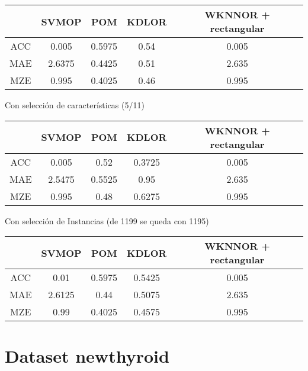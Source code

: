\begin{tabular}{ c c c c c }
	& SVMOP & POM & KDLOR & WKNNOR + rectangular \\
	\hline	
	ACC &	0.005 & 0.5975 & 0.54  & 0.005 \\
	MAE &	2.6375 & 0.4425 & 0.51  & 2.635 \\
	MZE &	0.995 & 0.4025 & 0.46  & 0.995  \\
	\hline  
\end{tabular}

Con selección de características (5/11)

\begin{tabular}{ c c c c c }
	& SVMOP & POM & KDLOR & WKNNOR + rectangular \\
	\hline	
	ACC &	0.005 & 0.52 & 0.3725  & 0.005 \\
	MAE &	2.5475 & 0.5525 & 0.95  & 2.635 \\
	MZE &	0.995 & 0.48 & 0.6275 & 0.995  \\
	\hline  
\end{tabular}

Con selección de Instancias (de 1199 se queda con 1195)

\begin{tabular}{ c c c c c }
	& SVMOP & POM & KDLOR & WKNNOR + rectangular \\
	\hline	
	ACC &	0.01 & 0.5975 & 0.5425  & 0.005 \\
	MAE &	2.6125 & 0.44 & 0.5075  & 2.635 \\
	MZE &	0.99 & 0.4025 & 0.4575 & 0.995  \\
	\hline  
\end{tabular}

\section{Dataset newthyroid}